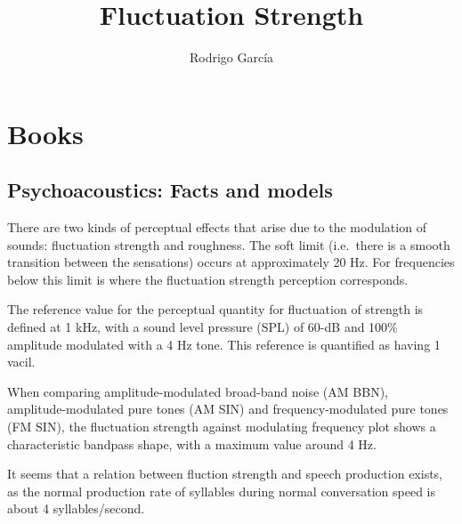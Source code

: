 \documentclass{article}
\begin{document}
\title{Fluctuation Strength}
\author{Rodrigo García}
\maketitle

\section{Books}

\subsection{Psychoacoustics: Facts and models}

There are two kinds of perceptual effects that arise due to the modulation of
sounds: fluctuation strength and roughness. The soft limit (i.e.\ there is a
smooth transition between the sensations) occurs at approximately 20 Hz. For
frequencies below this limit is where the fluctuation strength perception
corresponds.

The reference value for the perceptual quantity for fluctuation of strength is
defined at 1 kHz, with a sound level pressure (SPL) of 60-dB and 100\% amplitude
modulated with a 4 Hz tone. This reference is quantified as having 1 vacil.

When comparing amplitude-modulated broad-band noise (AM BBN), \\
amplitude-modulated pure tones (AM SIN) and frequency-modulated pure tones
(FM SIN), the fluctuation strength against modulating frequency plot shows a
characteristic bandpass shape, with a maximum value around 4 Hz.

It seems that a relation between fluction strength and speech production exists,
as the normal production rate of syllables during normal conversation speed is
about 4 syllables/second.
\end{document}
